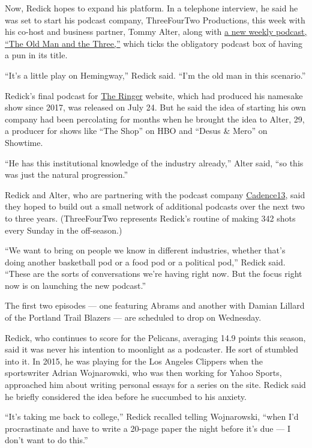 Now, Redick hopes to expand his platform. In a telephone interview, he
said he was set to start his podcast company, ThreeFourTwo Productions,
this week with his co-host and business partner, Tommy Alter, along with
\href{https://podcasts.apple.com/us/podcast/the-old-man-and-the-three-with-jj-redick-and-tommy-alter/id1525281746}{a
new weekly podcast, ``The Old Man and the Three,''} which ticks the
obligatory podcast box of having a pun in its title.

``It's a little play on Hemingway,'' Redick said. ``I'm the old man in
this scenario.''

Redick's final podcast for
\href{https://www.theringer.com/the-jj-redick-podcast}{The Ringer}
website, which had produced his namesake show since 2017, was released
on July 24. But he said the idea of starting his own company had been
percolating for months when he brought the idea to Alter, 29, a producer
for shows like ``The Shop'' on HBO and ``Desus \& Mero'' on Showtime.

``He has this institutional knowledge of the industry already,'' Alter
said, ``so this was just the natural progression.''

Redick and Alter, who are partnering with the podcast company
\href{http://www.cadence13.com/}{Cadence13}, said they hoped to build
out a small network of additional podcasts over the next two to three
years. (ThreeFourTwo represents Redick's routine of making 342 shots
every Sunday in the off-season.)

``We want to bring on people we know in different industries, whether
that's doing another basketball pod or a food pod or a political pod,''
Redick said. ``These are the sorts of conversations we're having right
now. But the focus right now is on launching the new podcast.''

The first two episodes --- one featuring Abrams and another with Damian
Lillard of the Portland Trail Blazers --- are scheduled to drop on
Wednesday.

Redick, who continues to score for the Pelicans, averaging 14.9 points
this season, said it was never his intention to moonlight as a
podcaster. He sort of stumbled into it. In 2015, he was playing for the
Los Angeles Clippers when the sportswriter Adrian Wojnarowski, who was
then working for Yahoo Sports, approached him about writing personal
essays for a series on the site. Redick said he briefly considered the
idea before he succumbed to his anxiety.

``It's taking me back to college,'' Redick recalled telling Wojnarowski,
``when I'd procrastinate and have to write a 20-page paper the night
before it's due --- I don't want to do this.''


